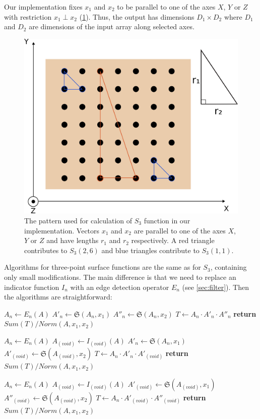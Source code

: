\documentclass[1p]{elsarticle}
\begin{document}
Our implementation fixes $x_1$ and $x_2$ to be parallel to one of the axes $X$,
$Y$ or $Z$ with restriction $x_1 \perp x_2$ (\cref{fig:pattern}). Thus, the
output has dimensions $D_1 \times D_2$ where $D_1$ and $D_2$ are dimensions of
the input array along selected axes.
\begin{figure}[ht]
  \centering
  \includegraphics[width=0.5\linewidth]{images/pattern.png}
  \caption[]{The pattern used for calculation of $S_3$ function in our
    implementation. Vectors $x_1$ and $x_2$ are parallel to one of the axes $X$,
    $Y$ or $Z$ and have lengths $r_1$ and $r_2$ respectively. A red triangle
    contributes to $S_3(2, 6)$ and blue triangles contribute to $S_3(1, 1)$.}
  \label{fig:pattern}
\end{figure}

Algorithms for three-point surface functions are the same as for $S_3$,
containing only small modifications. The main difference is that we need to
replace an indicator function $I_n$ with an edge detection operator $E_n$
(see \ref{sec:filter}). Then the algorithms are straightforward:
\begin{algorithmic}[1]
  \State $A_n \gets E_n (A)$
  \State $A'_n \gets \mathfrak{S}(A_n, x_1)$
  \State $A''_n \gets \mathfrak{S}(A_n, x_2)$
  \State $T \gets A_n \cdot A'_n \cdot A''_n$
  \State \textbf{return} $Sum(T) / Norm(A, x_1, x_2)$
  \EndProcedure

  \State $A_n \gets E_n (A)$
  \State $A_{(void)} \gets I_{(void)} (A)$
  \State $A'_n \gets \mathfrak{S}(A_n, x_1)$
  \State $A'_{(void)} \gets \mathfrak{S}(A_{(void)}, x_2)$
  \State $T \gets A_n \cdot A'_n \cdot A'_{(void)}$
  \State \textbf{return} $Sum(T) / Norm(A, x_1, x_2)$
  \EndProcedure

  \State $A_n \gets E_n (A)$
  \State $A_{(void)} \gets I_{(void)} (A)$
  \State $A'_{(void)} \gets \mathfrak{S}(A_{(void)}, x_1)$
  \State $A''_{(void)} \gets \mathfrak{S}(A_{(void)}, x_2)$
  \State $T \gets A_n \cdot A'_{(void)} \cdot A''_{(void)}$
  \State \textbf{return} $Sum(T) / Norm(A, x_1, x_2)$
  \EndProcedure
\end{algorithmic}
\end{document}
